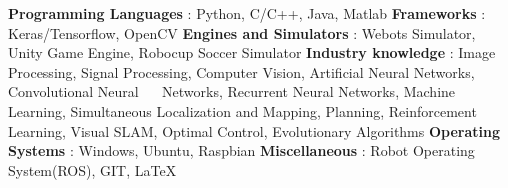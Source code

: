 \begin{cventries}  
\skillentry
    {
    \bullet \space \textbf{Programming Languages} : Python, C/C++, Java, Matlab \newline
    \bullet \space \textbf{Frameworks} : Keras/Tensorflow, OpenCV   \newline
    \bullet \space \textbf{Engines and Simulators} : Webots Simulator, Unity Game Engine, Robocup Soccer Simulator \newline
    \bullet \space \textbf{Industry knowledge} : Image Processing, Signal Processing, Computer Vision, Artificial Neural Networks, Convolutional Neural \newline $\quad$ Networks, Recurrent Neural Networks, Machine Learning, Simultaneous Localization and Mapping, Planning, Reinforcement \newline $\quad$ Learning, Visual SLAM, Optimal Control, Evolutionary Algorithms   \newline
    \bullet \space \textbf{Operating Systems} : Windows, Ubuntu, Raspbian \newline
    \bullet \space \textbf{Miscellaneous} : Robot Operating System(ROS), GIT, LaTeX
    }
\end{cventries}

